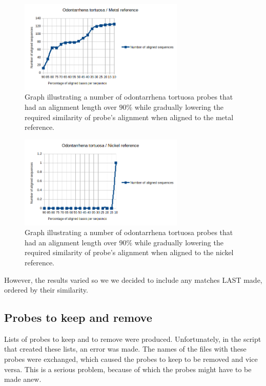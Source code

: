 \begin{figure}
\centerline{
	\includegraphics[width=0.7\textwidth]{images/odontarrhena_metal_sim.png}
}
\caption[Lowering of the required alignment similarity for succesful alignment]{Graph illustrating a number of odontarrhena tortuosa probes that had an alignment length over $90\%$ while gradually lowering the required similarity of probe's alignment when aligned to the metal reference.}
\label{obr:odo_met_sim}
\end{figure}

\begin{figure}
\centerline{
	\includegraphics[width=0.7\textwidth]{images/odontarrhena_nickel_sim.png}
}
\caption[Lowering of the required alignment similarity for succesful alignment]{Graph illustrating a number of odontarrhena tortuosa probes that had an alignment length over $90\%$ while gradually lowering the required similarity of probe's alignment when aligned to the nickel reference.}
\label{obr:odo_nick_sim}
\end{figure}

However, the results varied so we we decided to include any matches LAST made, ordered by their similarity. 


\subsection{Probes to keep and remove}

Lists of probes to keep and to remove were produced. 
Unfortunately, in the script that created these lists, an error was made. The names of the files with these probes were exchanged, which caused the probes to keep to be removed and vice versa. 
This is a serious problem, because of which the probes might have to be made anew. 


